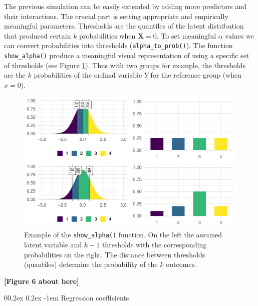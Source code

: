 \documentclass[
  man,floatsintext]{apa6}
\makeatletter
\let\oldparagraph\paragraph
\renewcommand{\paragraph}[1]{\oldparagraph{#1}\mbox{}}
\renewcommand{\paragraph}{\@startsection{paragraph}{4}{\parindent}%
  {0\baselineskip \@plus 0.2ex \@minus 0.2ex}%
  {-1em}%
  {\normalfont\normalsize\bfseries\itshape\typesectitle}}
\makeatother
\begin{document}
The previous simulation can be easily extended by adding more predictors and their interactions. The crucial part is setting appropriate and empirically meaningful parameters. Thresholds are the quantiles of the latent distribution that produced certain \(k\) probabilities when \(\mathbf{X} = 0\). To set meaningful \(\alpha\) values we can convert probabilities into thresholds (\texttt{alpha\_to\_prob()}). The function \texttt{show\_alpha()} produce a meaningful visual representation of using a specific set of thresholds (see Figure \ref{fig:fig-show-th-example}). Thus with two groups for example, the thresholds are the \(k\) probabilities of the ordinal variable \(Y\) for the reference group (when \(x = 0\)).

\scriptsize

\begin{figure}

{\centering \includegraphics[width=1\linewidth]{paper_files/figure-latex/fig-show-th-example-1} 

}

\caption{Example of the \texttt{show\_alpha()} function. On the left the assumed latent variable and \(k - 1\) thresholds with the corresponding probabilities on the right. The distance between thresholds (quantiles) determine the probability of the \(k\) outcomes.}\label{fig:fig-show-th-example}
\end{figure}

\begin{center}\textbf{[Figure 6 about here]} \end{center}

\normalsize

\paragraph{Regression coefficients}\label{regression-coefficients}
\end{document}
